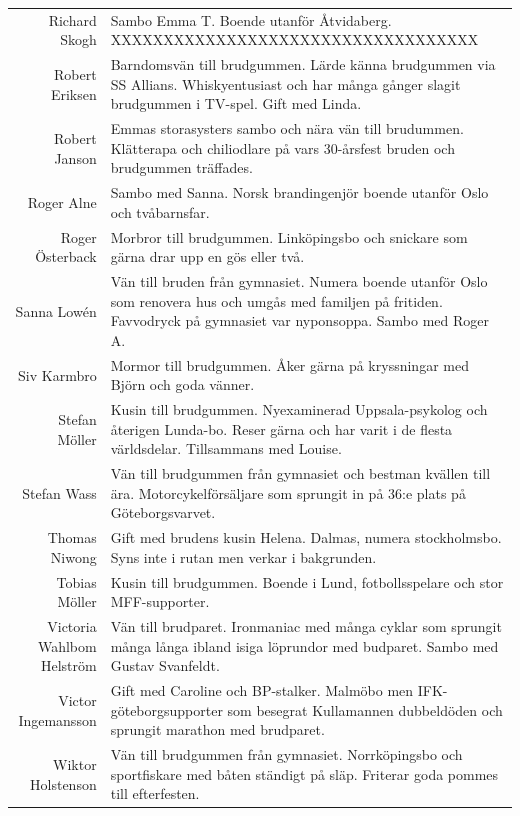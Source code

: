 \documentclass[a5paper]{article}
\begin{document}
\begin{longtable}[l]{N|L}
				Richard Skogh	&	Sambo Emma T. Boende utanför Åtvidaberg.  XXXXXXXXXXXXXXXXXXXXXXXXXXXXXXXXXXX	\\
				Robert Eriksen	&	Barndomsvän till brudgummen. Lärde känna brudgummen via SS Allians. Whiskyentusiast och har många gånger slagit brudgummen i TV-spel. Gift med Linda. 	\\
				Robert Janson	&	Emmas storasysters sambo och nära vän till brudummen. Klätterapa och chiliodlare på vars 30-årsfest bruden och brudgummen träffades.	\\
				Roger Alne	&	Sambo med Sanna. Norsk brandingenjör boende utanför Oslo och tvåbarnsfar.	\\
				Roger Österback	&	Morbror till brudgummen. Linköpingsbo och snickare som gärna drar upp en gös eller två.	\\
				Sanna Lowén	&	Vän till bruden från gymnasiet. Numera boende utanför Oslo som renovera hus och umgås med familjen på fritiden. Favvodryck på gymnasiet var nyponsoppa. Sambo med Roger A.	\\
				Siv Karmbro	&	Mormor till brudgummen. Åker gärna på kryssningar med Björn och goda vänner.	\\
				Stefan Möller	&	Kusin till brudgummen. Nyexaminerad Uppsala-psykolog och återigen Lunda-bo. Reser gärna och har varit i de flesta världsdelar. Tillsammans med Louise.	\\
				Stefan Wass	&	Vän till brudgummen från gymnasiet och bestman kvällen till ära. Motorcykelförsäljare som sprungit in på 36:e plats på Göteborgsvarvet.	\\
				Thomas Niwong	&	Gift med brudens kusin Helena. Dalmas, numera stockholmsbo. Syns inte i rutan men verkar i bakgrunden.	\\
				Tobias Möller	&	Kusin till brudgummen. Boende i Lund, fotbollsspelare och stor MFF-supporter.	\\
				Victoria Wahlbom Helström	&	Vän till brudparet. Ironmaniac med många cyklar som sprungit många långa ibland isiga löprundor med budparet. Sambo med Gustav Svanfeldt.	\\
				Victor Ingemansson	&	Gift med Caroline och BP-stalker. Malmöbo men IFK-göteborgsupporter som besegrat Kullamannen dubbeldöden och sprungit marathon med brudparet.	\\
				Wiktor Holstenson	&	Vän till brudgummen från gymnasiet. Norrköpingsbo och sportfiskare med båten ständigt på släp. Friterar goda pommes till efterfesten. 	\\
		\end{longtable}
	
\end{document}
